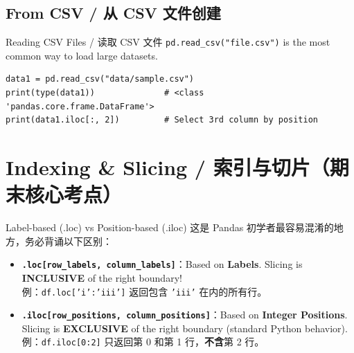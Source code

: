 \documentclass[11pt,a4paper]{report}
\let\oldtexttt\texttt
\renewcommand{\texttt}[1]{\textcolor{mainblue}{\oldtexttt{#1}}}
\begin{document}
\subsection{From CSV / 从 CSV 文件创建}

\begin{examplebox}{Reading CSV Files / 读取 CSV 文件}
    \texttt{pd.read\_csv("file.csv")} is the most common way to load large datasets.
\begin{lstlisting}
data1 = pd.read_csv("data/sample.csv")
print(type(data1))              # <class 'pandas.core.frame.DataFrame'>
print(data1.iloc[:, 2])         # Select 3rd column by position
\end{lstlisting}
\end{examplebox}

\section{Indexing \& Slicing / 索引与切片（期末核心考点）}

\begin{warning}{Label-based (.loc) vs Position-based (.iloc)}
    这是 Pandas 初学者最容易混淆的地方，务必背诵以下区别：
    \begin{itemize}[itemsep=0.8em]
        \item \textbf{\texttt{.loc[row\_labels, column\_labels]}}：Based on \textbf{Labels}. Slicing is \textbf{INCLUSIVE} of the right boundary! \\
        例：\texttt{df.loc['i':'iii']} 返回包含 \texttt{'iii'} 在内的所有行。
        \item \textbf{\texttt{.iloc[row\_positions, column\_positions]}}：Based on \textbf{Integer Positions}. Slicing is \textbf{EXCLUSIVE} of the right boundary (standard Python behavior). \\
        例：\texttt{df.iloc[0:2]} 只返回第 0 和第 1 行，\textbf{不含}第 2 行。
    \end{itemize}
\end{warning}
\end{document}
